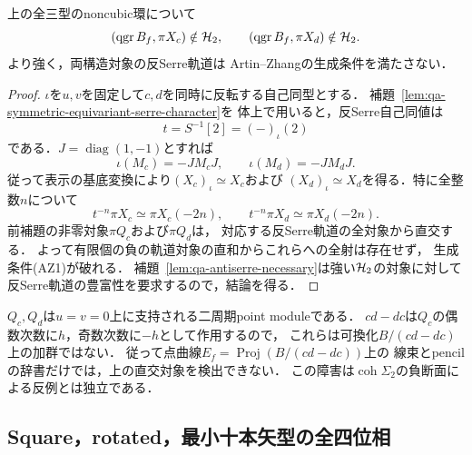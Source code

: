\begin{theorem}
\label{thm:qa-spinor-pointing-not-h2}
上の全三型のnoncubic環について
\[
 (\operatorname{qgr} B_f,\pi X_c)\notin\mathcal H_2,
 \qquad
 (\operatorname{qgr} B_f,\pi X_d)\notin\mathcal H_2.
\]
より強く，両構造対象の反Serre軌道は
Artin--Zhangの生成条件を満たさない．
\end{theorem}
\begin{proof}
$\iota$を$u,v$を固定して$c,d$を同時に反転する自己同型とする．
補題~\ref{lem:qa-symmetric-equivariant-serre-character}を
体上で用いると，反Serre自己同値は
\[
 t=S^{-1}[2]=(-)_\iota(2)
\]
である．$J=\operatorname{diag}(1,-1)$とすれば
\[
 \iota(M_c)=-J M_c J,
 \qquad \iota(M_d)=-J M_d J.
\]
従って表示の基底変換により$(X_c)_\iota\simeq X_c$および
$(X_d)_\iota\simeq X_d$を得る．特に全整数$n$について
\[
 t^{-n}\pi X_c\simeq\pi X_c(-2n),
 \qquad t^{-n}\pi X_d\simeq\pi X_d(-2n).
\]
前補題の非零対象$\pi Q_c$および$\pi Q_d$は，
対応する反Serre軌道の全対象から直交する．
よって有限個の負の軌道対象の直和からこれらへの全射は存在せず，
生成条件(AZ1)が破れる．
補題~\ref{lem:qa-antiserre-necessary}は強い$\mathcal H_2$の対象に対して
反Serre軌道の豊富性を要求するので，結論を得る．
\end{proof}

\begin{remark}[障害の位置]
$Q_c,Q_d$は$u=v=0$上に支持される二周期point moduleである．
$cd-dc$は$Q_c$の偶数次数に$h$，奇数次数に$-h$として作用するので，
これらは可換化$B/(cd-dc)$上の加群ではない．
従って点曲線$E_f=\operatorname{Proj}(B/(cd-dc))$上の
線束とpencilの辞書だけでは，上の直交対象を検出できない．
この障害は$\operatorname{coh}\Sigma_2$の負断面による反例とは独立である．
\end{remark}

\subsection{Square，rotated，最小十本矢型の全四位相}

